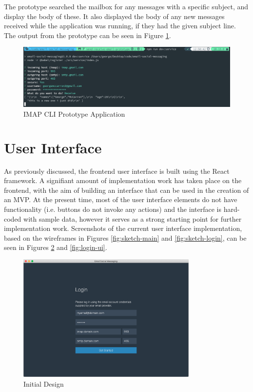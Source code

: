 The prototype searched the mailbox for any messages with a specific subject, and display the body of these. It also displayed the body of any new messages received while the application was running, if they had the given subject line. The output from the prototype can be seen in Figure \ref{fig:imap-cli}.

\begin{figure}[h!]
  \centering
  \includegraphics[width=\textwidth]{images/imap-cli.png}
  \caption{IMAP CLI Prototype Application}
  \label{fig:imap-cli}
\end{figure}

\section{User Interface}
As previously discussed, the frontend user interface is built using the React framework. A signifiant amount of implementation work has taken place on the frontend, with the aim of building an interface that can be used in the creation of an MVP. At the present time, most of the user interface elements do not have functionality (i.e. buttons do not invoke any actions) and the interface is hard-coded with sample data, however it serves as a strong starting point for further implementation work. Screenshots of the current user interface implementation, based on the wireframes in Figures \ref{fig:sketch-main} and \ref{fig:sketch-login}, can be seen in Figures \ref{fig:main-ui} and \ref{fig:login-ui}.

\begin{figure}[h!]
  \centering
  \includegraphics[width=0.8\textwidth]{images/implementation-login.png}
  \caption{Initial Design}
  \label{fig:main-ui}
\end{figure}

